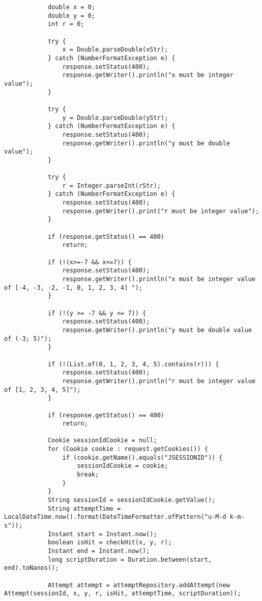 \documentclass{article}
\begin{document}
\begin{verbatim}
            double x = 0;
            double y = 0;
            int r = 0;
    
            try {
                x = Double.parseDouble(xStr);
            } catch (NumberFormatException e) {
                response.setStatus(400);
                response.getWriter().println("x must be integer value");
            }
    
            try {
                y = Double.parseDouble(yStr);
            } catch (NumberFormatException e) {
                response.setStatus(400);
                response.getWriter().println("y must be double value");
            }
    
            try {
                r = Integer.parseInt(rStr);
            } catch (NumberFormatException e) {
                response.setStatus(400);
                response.getWriter().print("r must be integer value");
            }
    
            if (response.getStatus() == 400)
                return;
    
            if (!(x>=-7 && x<=7)) {
                response.setStatus(400);
                response.getWriter().println("x must be integer value of [-4, -3, -2, -1, 0, 1, 2, 3, 4] ");
            }
    
            if (!(y >= -7 && y <= 7)) {
                response.setStatus(400);
                response.getWriter().println("y must be double value of (-3; 5)");
            }
    
            if (!(List.of(0, 1, 2, 3, 4, 5).contains(r))) {
                response.setStatus(400);
                response.getWriter().println("r must be integer value of [1, 2, 3, 4, 5]");
            }
    
            if (response.getStatus() == 400)
                return;
    
            Cookie sessionIdCookie = null;
            for (Cookie cookie : request.getCookies()) {
                if (cookie.getName().equals("JSESSIONID")) {
                    sessionIdCookie = cookie;
                    break;
                }
            }
            String sessionId = sessionIdCookie.getValue();
            String attemptTime = LocalDateTime.now().format(DateTimeFormatter.ofPattern("u-M-d k-m-s"));
            Instant start = Instant.now();
            boolean isHit = checkHit(x, y, r);
            Instant end = Instant.now();
            long scriptDuration = Duration.between(start, end).toNanos();
    
            Attempt attempt = attemptRepository.addAttempt(new Attempt(sessionId, x, y, r, isHit, attemptTime, scriptDuration));
    

\end{verbatim}
\end{document}
